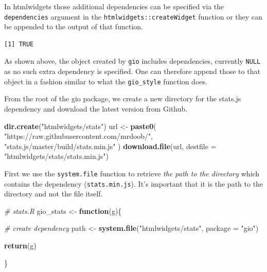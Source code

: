 \documentclass[10pt,]{krantz}
\makeatletter
\newenvironment{Shaded}{\begin{snugshade}}{\end{snugshade}}
\newcommand{\CommentTok}[1]{\textcolor[rgb]{0.37,0.37,0.37}{\textit{#1}}}
\newcommand{\ControlFlowTok}[1]{\textcolor[rgb]{0.27,0.27,0.27}{\textbf{#1}}}
\newcommand{\DataTypeTok}[1]{\textcolor[rgb]{0.27,0.27,0.27}{#1}}
\newcommand{\KeywordTok}[1]{\textcolor[rgb]{0.27,0.27,0.27}{\textbf{#1}}}
\newcommand{\NormalTok}[1]{#1}
\newcommand{\OperatorTok}[1]{\textcolor[rgb]{0.43,0.43,0.43}{\textbf{#1}}}
\newcommand{\StringTok}[1]{\textcolor[rgb]{0.5,0.5,0.5}{#1}}
\newenvironment{kframe}{%
\medskip{}
\setlength{\fboxsep}{.8em}
 \def\at@end@of@kframe{}%
 \ifinner\ifhmode%
  \def\at@end@of@kframe{\end{minipage}}%
  \begin{minipage}{\columnwidth}%
 \fi\fi%
 \def\FrameCommand##1{\hskip\@totalleftmargin \hskip-\fboxsep
 \colorbox{shadecolor}{##1}\hskip-\fboxsep
     \hskip-\linewidth \hskip-\@totalleftmargin \hskip\columnwidth}%
 \MakeFramed {\advance\hsize-\width
   \@totalleftmargin\z@ \linewidth\hsize
   \@setminipage}}%
 {\par\unskip\endMakeFramed%
 \at@end@of@kframe}
\renewenvironment{Shaded}{\begin{kframe}}{\end{kframe}}
\makeatother
\begin{document}
In htmlwidgets those additional dependencies can be specified via the \texttt{dependencies} argument in the \texttt{htmlwidgets::createWidget} function or they can be appended to the output of that function.

\begin{Shaded}
\end{Shaded}

\begin{verbatim}
[1] TRUE
\end{verbatim}

As shown above, the object created by \texttt{gio} includes dependencies, currently \texttt{NULL} as no such extra dependency is specified. One can therefore append those to that object in a fashion similar to what the \texttt{gio\_style} function does.

From the root of the gio package, we create a new directory for the stats.js dependency and download the latest version from Github.

\begin{Shaded}
\begin{Highlighting}[]
\KeywordTok{dir.create}\NormalTok{(}\StringTok{"htmlwidgets/stats"}\NormalTok{)}
\NormalTok{url <-}\StringTok{ }\KeywordTok{paste0}\NormalTok{(}
  \StringTok{"https://raw.githubusercontent.com/mrdoob/"}\NormalTok{,}
  \StringTok{"stats.js/master/build/stats.min.js"}
\NormalTok{)}
\KeywordTok{download.file}\NormalTok{(url, }\DataTypeTok{destfile =} \StringTok{"htmlwidgets/stats/stats.min.js"}\NormalTok{)}
\end{Highlighting}
\end{Shaded}

First we use the \texttt{system.file} function to retrieve \emph{the path to the directory} which contains the dependency (\texttt{stats.min.js}). It's important that it is the path to the directory and not the file itself.

\begin{Shaded}
\begin{Highlighting}[]
\CommentTok{# stats.R}
\NormalTok{gio_stats <-}\StringTok{ }\ControlFlowTok{function}\NormalTok{(g)\{}

  \CommentTok{# create dependency}
\NormalTok{  path <-}\StringTok{ }\KeywordTok{system.file}\NormalTok{(}\StringTok{"htmlwidgets/stats"}\NormalTok{, }\DataTypeTok{package =} \StringTok{"gio"}\NormalTok{)}

  \KeywordTok{return}\NormalTok{(g)}

\NormalTok{\}}
\end{Highlighting}
\end{Shaded}
\end{document}
